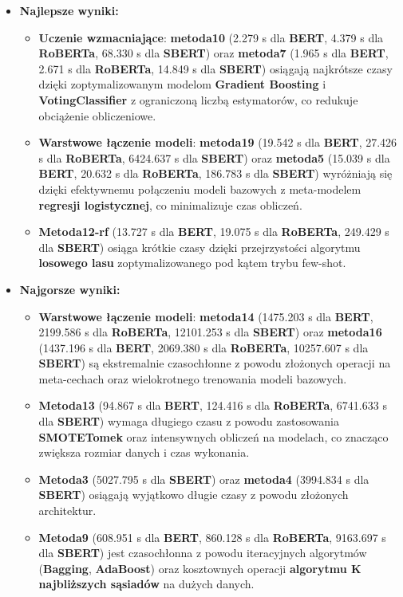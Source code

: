 \begin{itemize}
	\item \textbf{Najlepsze wyniki:}
	      \begin{itemize}
		      \item \textbf{Uczenie wzmacniające}: \textbf{metoda10} (2.279 s dla \textbf{BERT}, 4.379 s dla \textbf{RoBERTa}, 68.330 s dla \textbf{SBERT}) oraz \textbf{metoda7} (1.965 s dla \textbf{BERT}, 2.671 s dla \textbf{RoBERTa}, 14.849 s dla \textbf{SBERT}) osiągają najkrótsze czasy dzięki zoptymalizowanym modelom \textbf{Gradient Boosting} i \textbf{VotingClassifier} z ograniczoną liczbą estymatorów, co redukuje obciążenie obliczeniowe.
		      \item \textbf{Warstwowe łączenie modeli}: \textbf{metoda19} (19.542 s dla \textbf{BERT}, 27.426 s dla \textbf{RoBERTa}, 6424.637 s dla \textbf{SBERT}) oraz \textbf{metoda5} (15.039 s dla \textbf{BERT}, 20.632 s dla \textbf{RoBERTa}, 186.783 s dla \textbf{SBERT}) wyróżniają się dzięki efektywnemu połączeniu modeli bazowych z meta-modelem \textbf{regresji logistycznej}, co minimalizuje czas obliczeń.
		      \item \textbf{Metoda12-rf} (13.727 s dla \textbf{BERT}, 19.075 s dla \textbf{RoBERTa}, 249.429 s dla \textbf{SBERT}) osiąga krótkie czasy dzięki przejrzystości algorytmu \textbf{losowego lasu} zoptymalizowanego pod kątem trybu few-shot.
	      \end{itemize}
	\item \textbf{Najgorsze wyniki:}
	      \begin{itemize}
		      \item \textbf{Warstwowe łączenie modeli}: \textbf{metoda14} (1475.203 s dla \textbf{BERT}, 2199.586 s dla \textbf{RoBERTa}, 12101.253 s dla \textbf{SBERT}) oraz \textbf{metoda16} (1437.196 s dla \textbf{BERT}, 2069.380 s dla \textbf{RoBERTa}, 10257.607 s dla \textbf{SBERT}) są ekstremalnie czasochłonne z powodu złożonych operacji na meta-cechach oraz wielokrotnego trenowania modeli bazowych.
		      \item \textbf{Metoda13} (94.867 s dla \textbf{BERT}, 124.416 s dla \textbf{RoBERTa}, 6741.633 s dla \textbf{SBERT}) wymaga długiego czasu z powodu zastosowania \textbf{SMOTETomek} oraz intensywnych obliczeń na modelach, co znacząco zwiększa rozmiar danych i czas wykonania.
		      \item \textbf{Metoda3} (5027.795 s dla \textbf{SBERT}) oraz \textbf{metoda4} (3994.834 s dla \textbf{SBERT}) osiągają wyjątkowo długie czasy z powodu złożonych architektur.
		      \item \textbf{Metoda9} (608.951 s dla \textbf{BERT}, 860.128 s dla \textbf{RoBERTa}, 9163.697 s dla \textbf{SBERT}) jest czasochłonna z powodu iteracyjnych algorytmów (\textbf{Bagging}, \textbf{AdaBoost}) oraz kosztownych operacji \textbf{algorytmu K najbliższych sąsiadów} na dużych danych.
	      \end{itemize}
\end{itemize}

